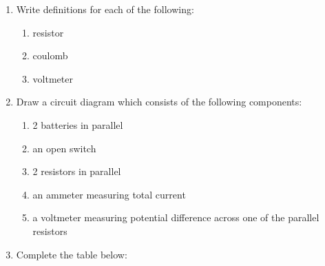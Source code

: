       
      \label{m38776*id68040}\begin{enumerate}[noitemsep, label=\textbf{\arabic*}. ] 
            \label{m38776*uid79}\item  Write definitions for each of the following:
\label{m38776*id68056}\begin{enumerate}[noitemsep, label=\textbf{\alph*}. ] 
            \label{m38776*uid80}\item resistor
\label{m38776*uid81}\item coulomb
\label{m38776*uid82}\item voltmeter
\end{enumerate}
                  \label{m38776*uid83}\item  Draw a circuit diagram which consists of the following components:
\label{m38776*id68109}\begin{enumerate}[noitemsep, label=\textbf{\alph*}. ] 
            \label{m38776*uid84}\item 2 batteries in parallel
\label{m38776*uid85}\item an open switch
\label{m38776*uid86}\item 2 resistors in parallel
\label{m38776*uid87}\item an ammeter measuring total current
\label{m38776*uid88}\item a voltmeter measuring potential difference across one of the parallel resistors
\end{enumerate}
                  \label{m38776*uid89}\item  Complete the table below:

    
      

\end{enumerate}
